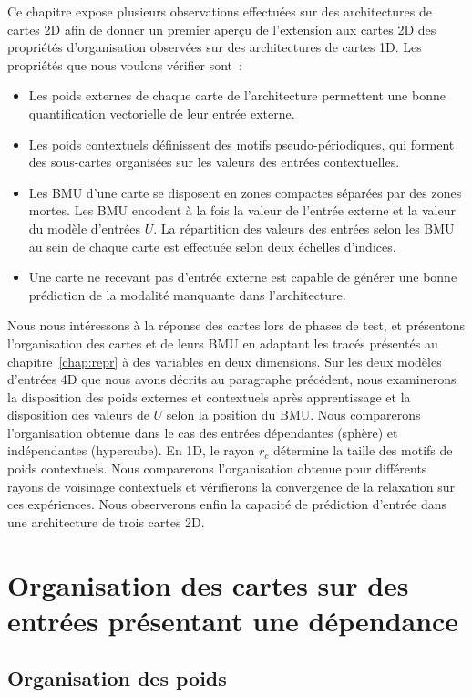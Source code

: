 \documentclass[../main]{subfiles}
\begin{document}
Ce chapitre expose plusieurs observations effectuées sur des architectures de cartes 2D afin de donner un premier aperçu de l'extension aux cartes 2D des propriétés d'organisation observées sur des architectures de cartes 1D.
Les propriétés que nous voulons vérifier sont~:
\begin{itemize}
	\item Les poids externes de chaque carte de l'architecture permettent une bonne quantification vectorielle de leur entrée externe.
	\item Les poids contextuels définissent des motifs pseudo-périodiques, qui forment des sous-cartes organisées sur les valeurs des entrées contextuelles.
	\item Les BMU d'une carte se disposent en zones compactes séparées par des zones mortes. Les BMU encodent à la fois la valeur de l'entrée externe et la valeur du modèle d'entrées $U$. 
	La répartition des valeurs des entrées selon les BMU au sein de chaque carte est effectuée selon deux échelles d'indices.
	\item Une carte ne recevant pas d'entrée externe est capable de générer une bonne prédiction de la modalité manquante dans l'architecture.
\end{itemize}

Nous nous intéressons à la réponse des cartes lors de phases de test, et présentons l'organisation des cartes et de leurs BMU en adaptant les tracés présentés au chapitre~\ref{chap:repr} à des variables en deux dimensions.
Sur les deux modèles d'entrées 4D que nous avons décrits au paragraphe précédent, nous examinerons la disposition des poids externes et contextuels après apprentissage et la disposition des valeurs de $U$ selon la position du BMU. Nous comparerons l'organisation obtenue dans le cas des entrées dépendantes (sphère) et indépendantes (hypercube).
En 1D, le rayon $r_c$ détermine la taille des motifs de poids contextuels. Nous comparerons l'organisation obtenue pour différents rayons de voisinage contextuels et vérifierons la convergence de la relaxation sur ces expériences. Nous observerons enfin la capacité de prédiction d'entrée dans une architecture de trois cartes 2D.

\section{Organisation des cartes sur des entrées présentant une dépendance \label{par:orga2D}}

\subsection{Organisation des poids}
\end{document}
